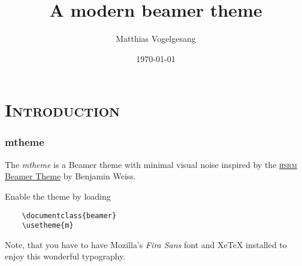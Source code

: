 \documentclass[10pt, compress]{beamer}
\title{A modern beamer theme}
\subtitle{}
\date{\today}
\author{Matthias Vogelgesang}
\institute{Institute or miscellaneous information}
\begin{document}
  
  \maketitle
  
  \section{\scshape Introduction}
    \begin{frame}[fragile]
      \frametitle{mtheme}

      The \emph{mtheme} is a Beamer theme with minimal visual noise inspired by the
      \href{https://github.com/hsrmbeamertheme/hsrmbeamertheme}{\textsc{hsrm} Beamer
      Theme} by Benjamin Weiss.

      Enable the theme by loading

      \begin{verbatim}
	\documentclass{beamer}
	\usetheme{m}
      \end{verbatim}

      Note, that you have to have Mozilla's \emph{Fira Sans} font and XeTeX
      installed to enjoy this wonderful typography.
    \end{frame}
\end{document}
